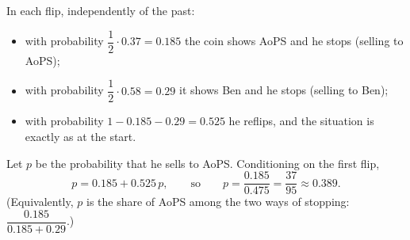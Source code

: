 In each flip, independently of the past:
\begin{itemize}
\item with probability $\dfrac12\cdot0.37=0.185$ the coin shows AoPS and he stops (selling to AoPS);
\item with probability $\dfrac12\cdot0.58=0.29$ it shows Ben and he stops (selling to Ben);
\item with probability $1-0.185-0.29=0.525$ he reflips, and the situation is exactly as at the start.
\end{itemize}
Let $p$ be the probability that he sells to AoPS. Conditioning on the first flip,
\[p=0.185+0.525\,p,\qquad\text{so}\qquad p=\dfrac{0.185}{0.475}=\boxed{\dfrac{37}{95}}\approx0.389.\]
(Equivalently, $p$ is the share of AoPS among the two ways of stopping: $\dfrac{0.185}{0.185+0.29}$.)
